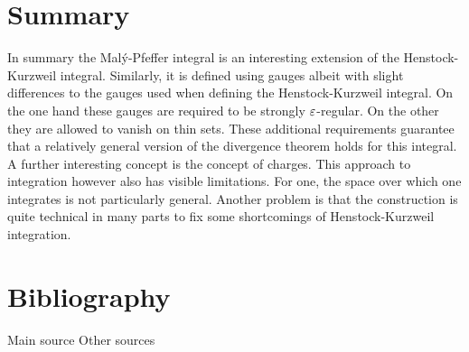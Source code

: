 %

\section{Summary}

In summary the Malý-Pfeffer integral is an interesting extension of the Henstock-Kurzweil integral. Similarly, it is defined using gauges albeit with slight differences to the gauges used when defining the Henstock-Kurzweil integral. On the one hand these gauges are required to be strongly $\varepsilon$-regular. On the other they are allowed to vanish on thin sets. These additional requirements guarantee that a relatively general version of the divergence theorem holds for this integral. A further interesting concept is the concept of charges. This approach to integration however also has visible limitations. For one, the space over which one integrates is not particularly general. Another problem is that the construction is quite technical in many parts to fix some shortcomings of Henstock-Kurzweil integration.

\newpage
\section*{Bibliography}
\nocite{*}
Main source
\printbibliography[heading=none, keyword={main}]
\noindent Other sources
\printbibliography[heading=none, keyword={secondary}]


